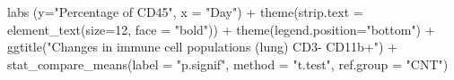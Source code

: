 \documentclass[
]{book}
\newenvironment{Shaded}{\begin{snugshade}}{\end{snugshade}}
\newcommand{\AttributeTok}[1]{\textcolor[rgb]{0.77,0.63,0.00}{#1}}
\newcommand{\DecValTok}[1]{\textcolor[rgb]{0.00,0.00,0.81}{#1}}
\newcommand{\FunctionTok}[1]{\textcolor[rgb]{0.00,0.00,0.00}{#1}}
\newcommand{\NormalTok}[1]{#1}
\newcommand{\SpecialCharTok}[1]{\textcolor[rgb]{0.00,0.00,0.00}{#1}}
\newcommand{\StringTok}[1]{\textcolor[rgb]{0.31,0.60,0.02}{#1}}
\begin{document}
\begin{Shaded}
\begin{Highlighting}[]
  \FunctionTok{labs}\NormalTok{ (}\AttributeTok{y=}\StringTok{"Percentage of CD45"}\NormalTok{, }\AttributeTok{x =} \StringTok{"Day"}\NormalTok{) }\SpecialCharTok{+} 
  \FunctionTok{theme}\NormalTok{(}\AttributeTok{strip.text =} \FunctionTok{element\_text}\NormalTok{(}\AttributeTok{size=}\DecValTok{12}\NormalTok{, }\AttributeTok{face =} \StringTok{"bold"}\NormalTok{)) }\SpecialCharTok{+} \FunctionTok{theme}\NormalTok{(}\AttributeTok{legend.position=}\StringTok{"bottom"}\NormalTok{) }\SpecialCharTok{+}
  \FunctionTok{ggtitle}\NormalTok{(}\StringTok{"Changes in immune cell populations (lung) CD3{-} CD11b+"}\NormalTok{) }\SpecialCharTok{+}
  \FunctionTok{stat\_compare\_means}\NormalTok{(}\AttributeTok{label =} \StringTok{"p.signif"}\NormalTok{, }\AttributeTok{method =} \StringTok{"t.test"}\NormalTok{,}
                     \AttributeTok{ref.group =} \StringTok{"CNT"}\NormalTok{)}




\end{Highlighting}
\end{Shaded}
\end{document}
